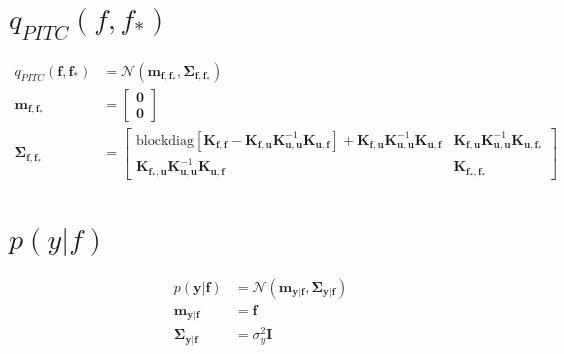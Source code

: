 \documentclass[12pt, landscape]{article}
\begin{document}
\section{$q_{PITC}(f,f_{*})$}
\begingroup\makeatletter{}\check@mathfonts
\def\maketag@@@#1{\hbox{\m@th\large\normalfont#1}}
\begin{align*}
q_{PITC}\left(\mathbf{f},\mathbf{f_{*}}\right)&= \mathcal{N}\left(\mathbf{m}_{\mathbf{f},\mathbf{f_{*}}},\mathbf{\Sigma}_{\mathbf{f},\mathbf{f_{*}}}\right)\\
\mathbf{m}_{\mathbf{f},\mathbf{f_{*}}} &= \left[\begin{smallmatrix}\mathbf{0}\\\mathbf{0}\end{smallmatrix}\right]\\
\mathbf{\Sigma}_{\mathbf{f},\mathbf{f_{*}}} &= \left[\begin{smallmatrix}\text{blockdiag}[\mathbf{K}_{\mathbf{f},\mathbf{f}} - \mathbf{K}_{\mathbf{f},\mathbf{u}} \mathbf{K}_{\mathbf{u},\mathbf{u}}^{-1} \mathbf{K}_{\mathbf{u},\mathbf{f}}] + \mathbf{K}_{\mathbf{f},\mathbf{u}} \mathbf{K}_{\mathbf{u},\mathbf{u}}^{-1} \mathbf{K}_{\mathbf{u},\mathbf{f}}&\mathbf{K}_{\mathbf{f},\mathbf{u}} \mathbf{K}_{\mathbf{u},\mathbf{u}}^{-1} \mathbf{K}_{\mathbf{u},\mathbf{f_{*}}}\\\mathbf{K}_{\mathbf{f_{*}},\mathbf{u}} \mathbf{K}_{\mathbf{u},\mathbf{u}}^{-1} \mathbf{K}_{\mathbf{u},\mathbf{f}}&\mathbf{K}_{\mathbf{f_{*}},\mathbf{f_{*}}}\end{smallmatrix}\right]\\
\end{align*}\endgroup

\section{$p(y|f)$}
\begingroup\makeatletter{}\check@mathfonts
\def\maketag@@@#1{\hbox{\m@th\large\normalfont#1}}
\begin{align*}
p\left(\mathbf{y}|\mathbf{f}\right)&= \mathcal{N}\left(\mathbf{m}_{\mathbf{y}|\mathbf{f}},\mathbf{\Sigma}_{\mathbf{y}|\mathbf{f}}\right)\\
\mathbf{m}_{\mathbf{y}|\mathbf{f}} &= \mathbf{f}\\
\mathbf{\Sigma}_{\mathbf{y}|\mathbf{f}} &= \sigma_y^{2} \mathbf{I}\\
\end{align*}\endgroup
\end{document}
